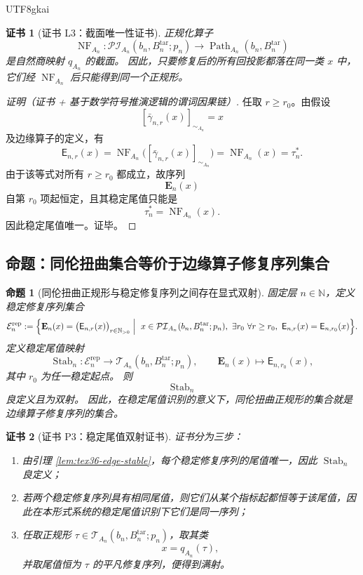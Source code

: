 \documentclass[12pt]{article}
\newtheorem{proposition}{命题}[section]
\newtheorem{Certificate}{证书}[section]
\newcommand{\NN}{\mathbb{N}}
\newcommand{\Path}{\operatorname{Path}}
\newcommand{\NF}{\operatorname{NF}}
\begin{document}
\begin{CJK*}{UTF8}{gkai}
\begin{Certificate}[证书 L3：截面唯一性证书]
\label{cert:tex36-l3}
正规化算子
\[
  \NF_{A_n}:
  \mathcal{PI}_{A_n}(b_n,B_n^{\mathrm{tar}};p_n)
  \to
  \Path_{A_n}(b_n,B_n^{\mathrm{tar}})
\]
是自然商映射 $q_{A_n}$ 的截面。
因此，只要修复后的所有回投影都落在同一类 $x$ 中，它们经 $\NF_{A_n}$ 后只能得到同一个正规形。
\end{Certificate}

\begin{proof}[证明（证书 + 基于数学符号推演逻辑的谓词因果链）]
任取 $r\ge r_0$。由假设
\[
  [\bar{\gamma}_{n,r}(x)]_{\sim_{A_n}}=x
\]
及边缘算子的定义，有
\[
  \mathsf E_{n,r}(x)
  =
  \NF_{A_n}\bigl([\bar{\gamma}_{n,r}(x)]_{\sim_{A_n}}\bigr)
  =
  \NF_{A_n}(x)
  =
  \tau_n^\ast.
\]
由于该等式对所有 $r\ge r_0$ 都成立，故序列
\[
  \mathbf E_n(x)
\]
自第 $r_0$ 项起恒定，且其稳定尾值只能是
\[
  \tau_n^\ast=\NF_{A_n}(x).
\]
因此稳定尾值唯一。证毕。
\end{proof}

\subsection{命题：同伦扭曲集合等价于边缘算子修复序列集合}
\label{subsec:tex36-twist-repair-seq}

\begin{proposition}[同伦扭曲正规形与稳定修复序列之间存在显式双射]
\label{prop:tex36-twist-sequence}
固定层 $n\in\NN$，定义稳定修复序列集合
\[
  \mathcal E_n^{\mathrm{rep}}
  :=
  \Bigl\{
    \mathbf E_n(x)=\bigl(\mathsf E_{n,r}(x)\bigr)_{r\in\NN_{>0}}
    \Bigm|\
    x\in \mathcal{PI}_{A_n}(b_n,B_n^{\mathrm{tar}};p_n),\
    \exists r_0\ \forall r\ge r_0,\ \mathsf E_{n,r}(x)=\mathsf E_{n,r_0}(x)
  \Bigr\}.
\]
定义稳定尾值映射
\[
  \operatorname{Stab}_n:
  \mathcal E_n^{\mathrm{rep}}
  \to
  \mathcal{T}_{A_n}(b_n,B_n^{\mathrm{tar}};p_n),
  \qquad
  \mathbf E_n(x)\mapsto \mathsf E_{n,r_0}(x),
\]
其中 $r_0$ 为任一稳定起点。
则
\[
  \operatorname{Stab}_n
\]
良定义且为双射。
因此，在稳定尾值识别的意义下，同伦扭曲正规形的集合就是边缘算子修复序列的集合。
\end{proposition}

\begin{Certificate}[证书 P3：稳定尾值双射证书]
\label{cert:tex36-p3}
证书分为三步：
\begin{enumerate}
  \item 由引理 \ref{lem:tex36-edge-stable}，每个稳定修复序列的尾值唯一，因此 $\operatorname{Stab}_n$ 良定义；
  \item 若两个稳定修复序列具有相同尾值，则它们从某个指标起都恒等于该尾值，因此在本形式系统的稳定尾值识别下它们是同一序列；
  \item 任取正规形 $\tau\in \mathcal{T}_{A_n}(b_n,B_n^{\mathrm{tar}};p_n)$，取其类
  \[
    x=q_{A_n}(\tau),
  \]
  并取尾值恒为 $\tau$ 的平凡修复序列，便得到满射。
\end{enumerate}
\end{Certificate}


\end{CJK*}
\end{document}
